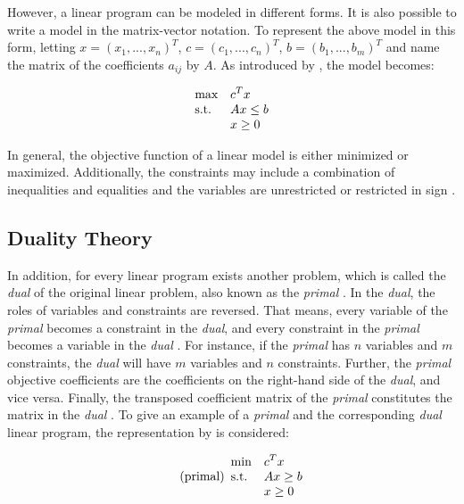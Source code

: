 However, a linear program can be modeled in different forms. It is also possible 
to write a model in the matrix-vector notation. To represent the above model in this form, letting
$x=(x_{1}, ..., x_{n})^{T}$, $c=(c_{1}, ..., c_{n})^{T}$, $b=(b_{1}, ..., b_{m})^{T}$
and name the matrix of the coefficients $a_{ij}$ by $A$. As introduced by ,
the model becomes:

\begin{equation*}
    \begin{array}{ll@{}ll}
        \text{max}  & \displaystyle c^{T}x &\\
        \text{s.t.}& \displaystyle Ax \leq b&\\
                    &                        x \geq 0
    \end{array}
\end{equation*}

\clearpage
In general, the objective function of a linear model is either minimized or maximized.
Additionally, the constraints may include a combination of inequalities and equalities
and the variables are unrestricted or restricted in sign .

\subsection{Duality Theory}
\label{sec:duality_theory}
In addition, for every linear program exists another problem, which
is called the \textit{dual} of the original linear problem, also known as the 
\textit{primal} .
In the \textit{dual}, the roles of variables and constraints are reversed. 
That means, every variable of the \textit{primal} becomes a constraint in the \textit{dual},
and every constraint in the \textit{primal} becomes a variable in 
the \textit{dual} .
For instance, if the \textit{primal} has $n$ variables and $m$ constraints, the \textit{dual}
will have $m$ variables and $n$ constraints. Further, the \textit{primal} objective coefficients 
are the coefficients on the right-hand side of 
the \textit{dual}, and vice versa.
Finally, the transposed coefficient matrix of the \textit{primal} constitutes the matrix in the 
\textit{dual} .
To give an example of a \textit{primal} and the corresponding \textit{dual} linear program,
the representation by  is considered:

\begin{equation}
    \tag{primal}
    \begin{array}{ll@{}ll}
        \text{min}  & \displaystyle c^{T}x &\\
        \text{s.t.}& \displaystyle Ax \geq b  &\\
                    &                        x \geq 0
    \end{array}
\end{equation}


